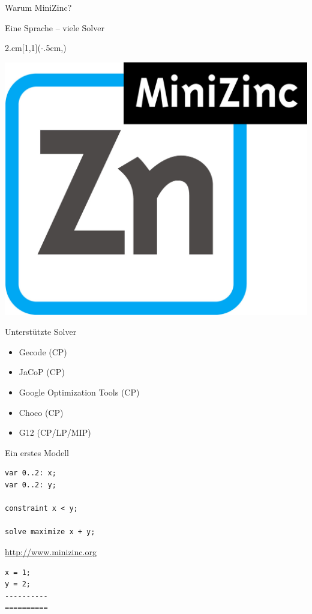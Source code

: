 \begin{frame}{Warum MiniZinc?}
\begin{parchment}[Rationale]
\centering 
\alert{Eine Sprache -- viele Solver} 
\end{parchment}
\begin{textblock*}{2.cm}[1,1](\textwidth-.5cm,\textheight-1.03cm)

\includegraphics[width=\textwidth]{img/MiniZn_logo.jpg} 

\end{textblock*}
Unterstützte Solver
\begin{itemize}
\item Gecode (CP)
\item JaCoP (CP)
\item Google Optimization Tools (CP)
\item Choco (CP)
\item G12 (CP/LP/MIP)
\end{itemize}

\end{frame}


\begin{frame}[fragile]{Ein erstes Modell}
\begin{lstlisting}
var 0..2: x;
var 0..2: y; 

constraint x < y;

solve maximize x + y;
\end{lstlisting}

\vspace*{2ex}

\url{http://www.minizinc.org}

\vspace*{2ex}

\small
\begin{verbatim}
x = 1;
y = 2;
----------
==========
\end{verbatim}

\end{frame}


